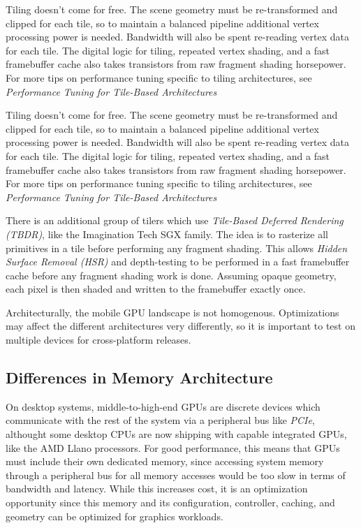 Tiling doesn't come for free.  The scene geometry must be re-transformed and
clipped for each tile, so to maintain a balanced pipeline additional vertex
processing power is needed.  Bandwidth will also be spent re-reading vertex
data for each tile.  The digital logic for tiling, repeated vertex shading, and
a fast framebuffer cache also takes transistors from raw fragment shading
horsepower.  For more tips on performance tuning specific to tiling
architectures, see \textit{Performance Tuning for Tile-Based Architectures}
\cite{Chapter TODO}

Tiling doesn't come for free.  The scene geometry must be re-transformed and
clipped for each
 tile, so to maintain a balanced pipeline additional vertex
processing power is
 needed.  Bandwidth will also be spent re-reading vertex
data for each tile.  The digital
 logic for tiling, repeated vertex shading,
and a fast framebuffer cache also
 takes transistors from raw fragment shading
horsepower.  For more tips on
 performance tuning specific to tiling
architectures, see \textit{Performance
 Tuning for Tile-Based Architectures}
\cite{Chapter TODO}
 

 There is an additional group of tilers
which use \textit{Tile-Based Deferred Rendering (TBDR)}, like the Imagination Tech SGX
family.  The idea is to rasterize all primitives in a tile before performing
any fragment shading.  This allows \textit{Hidden Surface Removal (HSR)} and
depth-testing to be performed in a fast framebuffer cache before any fragment
shading work is done.  Assuming opaque geometry, each pixel is then shaded and
written to the framebuffer exactly once.

Architecturally, the mobile GPU landscape is not homogenous.  Optimizations may
affect the different architectures very differently, so it is important to test
on multiple devices for cross-platform releases.  \subsection{Differences in
Memory
Architecture}\label{Jon-McCaffrey:differences-in-memory-architecture}

On desktop systems, middle-to-high-end GPUs are discrete devices which
communicate with the rest of the system via a peripheral bus like
\textit{PCIe}, althought some desktop CPUs are now shipping with capable
integrated GPUs, like the AMD Llano processors.  For good performance, this
means that GPUs must include their own dedicated memory, since accessing system
memory through a peripheral bus for all memory accesses would be too slow in
terms of bandwidth and latency.  While this increases cost, it is an
optimization opportunity since this memory and its configuration, controller,
caching, and geometry can be optimized for graphics workloads.

